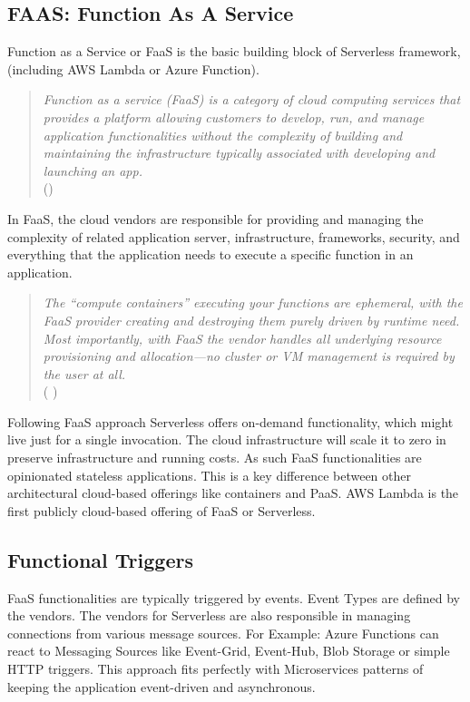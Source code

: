 \documentclass[12pt]{article}
\begin{document}
\subsection{FAAS: Function As A Service}
\par
\begin{flushleft}
Function as a Service or FaaS is the basic building block of Serverless framework, (including AWS Lambda or Azure Function). 
\begin{quote}
\textit{Function as a service (FaaS) is a category of cloud computing services that provides a platform allowing customers to develop, run, and manage application functionalities without the complexity of building and maintaining the infrastructure typically associated with developing and launching an app.} \\
(\cite{Wiki_function_as_a_service})
\end{quote}

\par
In FaaS, the cloud vendors are responsible for providing and managing the complexity of related application server, infrastructure, frameworks, security, and everything that the application needs to execute a specific function in an application. 

\begin{quote}
\textit{
The “compute containers” executing your functions are ephemeral, with the FaaS provider creating and destroying them purely driven by runtime need. Most importantly, with FaaS the vendor handles all underlying resource provisioning and allocation—no cluster or VM management is required by the user at all.}\\ ( \cite{Roberts_Mike_2018} )
\end{quote}

Following FaaS approach Serverless offers on-demand functionality, which might live just for a single invocation. The cloud infrastructure will scale it to zero in preserve infrastructure and running costs. As such FaaS functionalities are opinionated stateless applications. This is a key difference between other architectural cloud-based offerings like containers and PaaS. 
 AWS Lambda is the first publicly cloud-based offering of FaaS or Serverless. 

\subsection{Functional Triggers}
FaaS functionalities are typically triggered by events. Event Types are defined by the vendors. The vendors for Serverless are also responsible in managing connections from various message sources. For Example:  Azure Functions can react to Messaging Sources like Event-Grid, Event-Hub, Blob Storage or simple HTTP triggers. This approach fits perfectly with Microservices patterns of keeping the application event-driven and asynchronous.


\end{flushleft}
\end{document}
